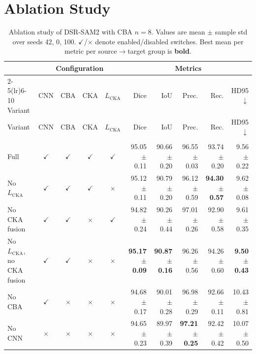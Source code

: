 \documentclass[10pt]{article}
\begin{document}
\newpage

\section{Ablation Study}
\label{sec:ablation}

{\scriptsize
\setlength{\tabcolsep}{2pt}
\begin{longtable}{lcccc rrrrr}
\caption{Ablation study of DSR-SAM2 with CBA $n=8$. Values are mean $\pm$ sample std over seeds 42, 0, 100. $\checkmark$/$\times$ denote enabled/disabled switches. Best mean per metric per source$\rightarrow$target group is \textbf{bold}.}
\label{tab:ablation_dsr_sam2}\\
\toprule
& \multicolumn{4}{c}{Configuration} & \multicolumn{5}{c}{Metrics} \\
\cmidrule(lr){2-5}\cmidrule(lr){6-10}
Variant & CNN & CBA & CKA & $L_{\mathrm{CKA}}$ & Dice & IoU & Prec. & Rec. & HD95$\downarrow$ \\
\midrule
\endfirsthead
\toprule
Variant & CNN & CBA & CKA & $L_{\mathrm{CKA}}$ & Dice & IoU & Prec. & Rec. & HD95$\downarrow$ \\
\midrule
\endhead
\endfoot
\bottomrule
\endlastfoot
\multicolumn{10}{l}{\textit{Source: OTU $\rightarrow$ Target: OVATUS}} \\
\midrule
Full & $\checkmark$ & $\checkmark$ & $\checkmark$ & $\checkmark$ & 95.05 $\pm$ 0.11 & 90.66 $\pm$ 0.20 & 96.55 $\pm$ 0.03 & 93.74 $\pm$ 0.20 & 9.56 $\pm$ 0.22 \\
No $L_{\mathrm{CKA}}$ & $\checkmark$ & $\checkmark$ & $\checkmark$ & $\times$ & 95.12 $\pm$ 0.11 & 90.79 $\pm$ 0.20 & 96.12 $\pm$ 0.59 & \textbf{94.30 $\pm$ 0.57} & 9.62 $\pm$ 0.08 \\
No CKA fusion & $\checkmark$ & $\checkmark$ & $\times$ & $\checkmark$ & 94.82 $\pm$ 0.24 & 90.26 $\pm$ 0.44 & 97.01 $\pm$ 0.26 & 92.90 $\pm$ 0.58 & 9.61 $\pm$ 0.35 \\
No $L_{\mathrm{CKA}}$, no CKA fusion & $\checkmark$ & $\checkmark$ & $\times$ & $\times$ & \textbf{95.17 $\pm$ 0.09} & \textbf{90.87 $\pm$ 0.16} & 96.26 $\pm$ 0.56 & 94.26 $\pm$ 0.60 & \textbf{9.50 $\pm$ 0.43} \\
No CBA & $\checkmark$ & $\times$ & $\times$ & $\times$ & 94.68 $\pm$ 0.17 & 90.01 $\pm$ 0.28 & 96.98 $\pm$ 0.29 & 92.66 $\pm$ 0.11 & 10.43 $\pm$ 0.81 \\
No CNN & $\times$ & $\times$ & $\times$ & $\times$ & 94.65 $\pm$ 0.23 & 89.97 $\pm$ 0.39 & \textbf{97.21 $\pm$ 0.25} & 92.42 $\pm$ 0.42 & 10.07 $\pm$ 0.50 \\

\end{longtable}}
\end{document}
